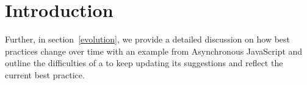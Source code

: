 \label{chapter:discussion}

\section{Introduction}
Further, in section~\ref{evolution}, we provide a detailed discussion on how best practices change over time with an example from Asynchronous JavaScript and outline the difficulties of a \cct{} to keep updating its suggestions and reflect the current best practice.






